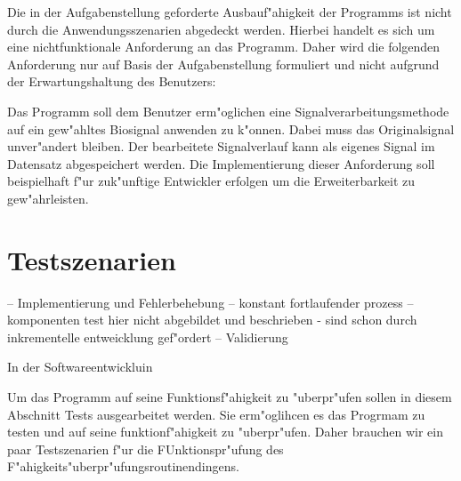 Die in der Aufgabenstellung geforderte Ausbauf"ahigkeit der Programms ist nicht durch die Anwendungsszenarien abgedeckt werden.
Hierbei handelt es sich um eine nichtfunktionale Anforderung an das Programm.
Daher wird die folgenden Anforderung nur auf Basis der Aufgabenstellung formuliert und nicht aufgrund der Erwartungshaltung des Benutzers:
\begin{enumerate}[resume]
	 Das Programm soll dem Benutzer erm"oglichen eine Signalverarbeitungsmethode auf ein gew"ahltes Biosignal anwenden zu k"onnen.
							Dabei muss das Originalsignal unver"andert bleiben.
							Der bearbeitete Signalverlauf kann als eigenes Signal im Datensatz abgespeichert werden.
							Die Implementierung dieser Anforderung soll beispielhaft f"ur zuk"unftige Entwickler erfolgen um die Erweiterbarkeit zu gew"ahrleisten.
\end{enumerate}

\section{Testszenarien}

-- Implementierung und Fehlerbehebung
-- konstant fortlaufender prozess
-- komponenten test hier nicht abgebildet und beschrieben - sind schon durch inkrementelle entweicklung gef"ordert
-- Validierung

In der Softwareentwickluin

Um das Programm auf seine Funktionsf"ahigkeit zu "uberpr"ufen sollen in diesem Abschnitt Tests ausgearbeitet werden.
Sie erm"oglihcen es das Progrmam zu testen und auf seine funktionf"ahigkeit zu "uberpr"ufen.
Daher brauchen wir ein paar Testszenarien f"ur die FUnktionspr"ufung des F"ahigkeits"uberpr"ufungsroutinendingens.


